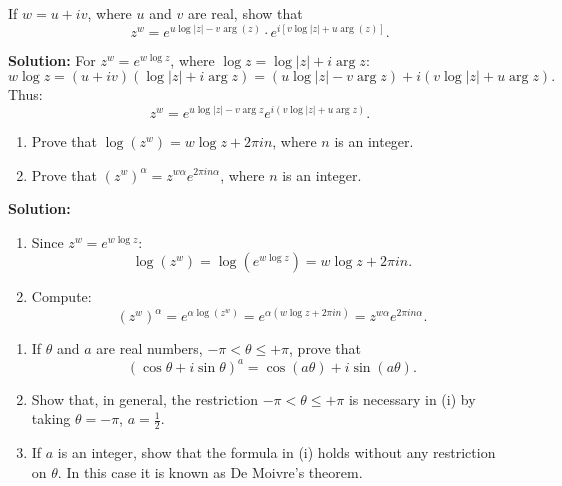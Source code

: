 \begin{problembox}
If \( w = u + iv \), where \( u \) and \( v \) are real, show that
\[
z^w = e^{u \log |z| - v \arg(z)} \cdot e^{i[v \log |z| + u \arg(z)]}.
\]
\end{problembox}

\textbf{Solution:}
For \( z^w = e^{w \log z} \), where \( \log z = \log |z| + i \arg z \):
\[
w \log z = (u + iv)(\log |z| + i \arg z) = (u \log |z| - v \arg z) + i(v \log |z| + u \arg z).
\]
Thus:
\[
z^w = e^{u \log |z| - v \arg z} e^{i(v \log |z| + u \arg z)}.
\]

\begin{problembox}
\begin{enumerate}[label=\alph*)]
\item Prove that \( \log(z^w) = w \log z + 2\pi i n \), where \( n \) is an integer.
\item Prove that \( (z^w)^\alpha = z^{w\alpha} e^{2\pi i n \alpha} \), where \( n \) is an integer.
\end{enumerate}
\end{problembox}

\textbf{Solution:}
\begin{enumerate}[label=\alph*)]
\item Since \( z^w = e^{w \log z} \):
\[
\log(z^w) = \log(e^{w \log z}) = w \log z + 2\pi i n.
\]
\item Compute:
\[
(z^w)^\alpha = e^{\alpha \log(z^w)} = e^{\alpha(w \log z + 2\pi i n)} = z^{w\alpha} e^{2\pi i n \alpha}.
\]
\end{enumerate}

\begin{problembox}
\begin{enumerate}[label=\roman*)]
\item If \( \theta \) and \( a \) are real numbers, \( -\pi < \theta \leq +\pi \), prove that
\[
(\cos \theta + i \sin \theta)^a = \cos(a\theta) + i \sin(a\theta).
\]
\item Show that, in general, the restriction \( -\pi < \theta \leq +\pi \) is necessary in (i) by taking \( \theta = -\pi \), \( a = \tfrac{1}{2} \).
\item If \( a \) is an integer, show that the formula in (i) holds without any restriction on \( \theta \). In this case it is known as De Moivre's theorem.
\end{enumerate}
\end{problembox}

